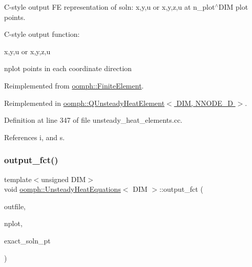 C-\/style output FE representation of soln\+: x,y,u or x,y,z,u at n\+\_\+plot$^\wedge$\+D\+IM plot points. 

C-\/style output function\+:

x,y,u or x,y,z,u

nplot points in each coordinate direction 

Reimplemented from \hyperlink{classoomph_1_1FiniteElement_adfaee690bb0608f03320eeb9d110d48c}{oomph\+::\+Finite\+Element}.



Reimplemented in \hyperlink{classoomph_1_1QUnsteadyHeatElement_af582182bc9c4df2fb77e4410b0579503}{oomph\+::\+Q\+Unsteady\+Heat\+Element$<$ D\+I\+M, N\+N\+O\+D\+E\+\_\+D $>$}.



Definition at line 347 of file unsteady\+\_\+heat\+\_\+elements.\+cc.



References i, and s.

\mbox{\label{classoomph_1_1UnsteadyHeatEquations_acdd4e941a196d267ad9534aef16db1a9}} 
\subsubsection{\texorpdfstring{output\+\_\+fct()}{output\_fct()}\hspace{0.1cm}{\footnotesize\ttfamily [1/2]}}
{\footnotesize\ttfamily template$<$unsigned D\+IM$>$ \\
void \hyperlink{classoomph_1_1UnsteadyHeatEquations}{oomph\+::\+Unsteady\+Heat\+Equations}$<$ D\+IM $>$\+::output\+\_\+fct (\begin{DoxyParamCaption}\item[{std\+::ostream \&}]{outfile,  }\item[{const unsigned \&}]{nplot,  }\item[{\hyperlink{classoomph_1_1FiniteElement_a690fd33af26cc3e84f39bba6d5a85202}{Finite\+Element\+::\+Steady\+Exact\+Solution\+Fct\+Pt}}]{exact\+\_\+soln\+\_\+pt }\end{DoxyParamCaption})\hspace{0.3cm}{\ttfamily [virtual]}}



